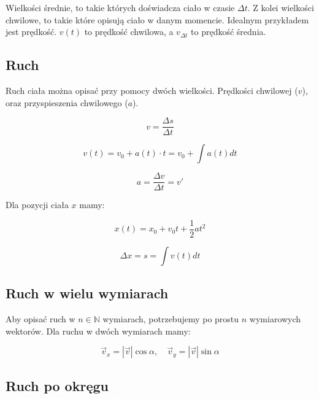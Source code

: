 \documentclass{../notatki}
\begin{document}
Wielkości średnie, to takie których doświadcza ciało w czasie $\Delta t$.
Z kolei wielkości chwilowe, to takie które opisują ciało w danym momencie.
Idealnym przykładem jest prędkość. $v(t)$ to prędkość chwilowa, a $v_{\Delta t}$
to prędkość średnia.

\subsection{Ruch}

Ruch ciała można opisać przy pomocy dwóch wielkości. Prędkości chwilowej ($v$),
oraz przyspieszenia chwilowego ($a$).

$$
v = \frac{\Delta s}{\Delta t}
$$

$$
v(t) = v_0 + a(t) \cdot t = v_0 + \int a(t) dt
$$

$$
a = \frac{\Delta v}{\Delta t} = v'
$$

Dla pozycji ciała $x$ mamy:

$$
x(t) = x_0 + v_0t + \frac{1}{2}a t^2
$$

$$
\Delta x = s = \int v(t) dt
$$

\subsection{Ruch w wielu wymiarach}

Aby opisać ruch w $n \in \mathbb{N}$ wymiarach, potrzebujemy po prostu $n$
wymiarowych wektorów. Dla ruchu w dwóch wymiarach mamy:

\begin{figure*}[h]
  \centering
\end{figure*}

$$
\vec{v}_x = |\vec{v}| \cos \alpha, \quad \vec{v}_y = |\vec{v}| \sin \alpha
$$

\subsection{Ruch po okręgu}
\end{document}
